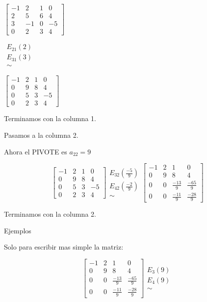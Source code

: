 $\begin{bmatrix}
-1 &  2  & 1  &  0\\
2  &  5  & 6  &  4\\
3  &  -1 & 0  &  -5\\
0  &   2 & 3  &  4
\end{bmatrix}$

$\begin{array}{c}
 E_{21}(2)\\
 E_{31}(3)\\
\sim
\end{array}$

$\begin{bmatrix}
-1 &  2  & 1  &  0\\
0  &  9  & 8  &  4\\
0  &  5 & 3  &  -5\\
0  &   2 & 3  &  4
\end{bmatrix}
$

{Terminamos con la columna 1.}

{Pasamos a la columna 2.}

Ahora el PIVOTE es $a_{22}=9$

$$
\begin{bmatrix}
-1 &  2  & 1  &  0\\
0  &  9  & 8  &  4\\
0  &  5 & 3  &  -5\\
0  &   2 & 3  &  4
\end{bmatrix}
\begin{array}{c}
 E_{32}(\frac{-5}{9})\\
 E_{42}(\frac{-2}{9})\\
\sim
\end{array}
\begin{bmatrix}
-1 &  2  & 1  &  0\\
0  &  9  & 8  &  4\\
0  &  0 & \frac{-13}{9}  &  \frac{-65}{9}\\
0  &  0 & \frac{-11}{9}  &  \frac{-28}{9}
\end{bmatrix}
$$

Terminamos con la columna 2.


{Ejemplos}

Solo para escribir mas simple la matriz:


$$
\begin{bmatrix}
-1 &  2  & 1  &  0\\
0  &  9  & 8  &  4\\
0  &  0 & \frac{-13}{9}  &  \frac{-65}{9}\\
0  &  0 & \frac{-11}{9}  &  \frac{-28}{9}
\end{bmatrix}
\begin{array}{c}
 E_{3}(9)\\
 E_{4}(9)\\
\sim
\end{array}$$

